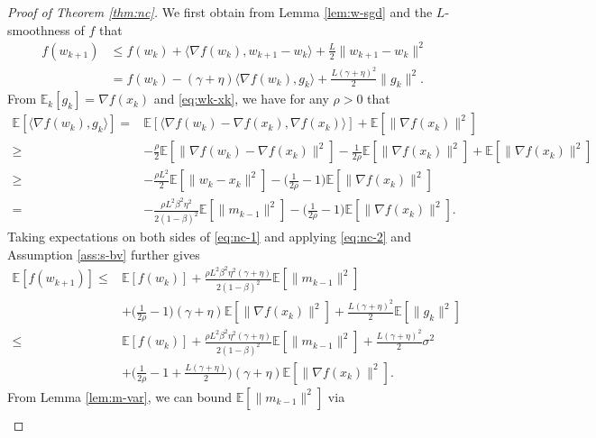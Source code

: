 \documentclass[10pt]{article}
\numberwithin{equation}{section}
\theoremstyle{definition}
\newcommand{\ebb}{\mathbb{E}}  %
\begin{document}
\begin{proof}[Proof of Theorem \ref{thm:nc}]
We first obtain from Lemma \ref{lem:w-sgd} and the $L$-smoothness of $f$ that
\begin{equation}\label{eq:nc-1}
\begin{aligned}
f(w_{k+1}) & \leq f(w_k)+\langle\nabla f(w_k), w_{k+1}-w_k\rangle+\frac{L}{2} \|w_{k+1}-w_k\|^2 \\
& =f(w_k)-(\gamma+\eta)\langle\nabla f(w_k), g_k\rangle+\frac{L (\gamma+\eta)^2}{2} \|g_k\|^2.
\end{aligned}
\end{equation}
From $\ebb_k[g_k]=\nabla f(x_k)$ and \eqref{eq:wk-xk}, we have for any $\rho>0$ that 
\begin{equation}\label{eq:nc-2}
\begin{aligned}
\ebb[\langle\nabla f(w_k), g_k\rangle]= & \ebb[\langle\nabla f(w_k)-\nabla f(x_k), \nabla f(x_k)\rangle]+\ebb[\|\nabla f(x_k)\|^2] \\
\ge & -\frac{\rho}{2} \ebb[\|\nabla f(w_k)-\nabla f(x_k)\|^2]- \frac{1}{2 \rho} \ebb[\|\nabla f(x_k)\|^2]+ \ebb[\|\nabla f(x_k)\|^2]\\
\ge & -\frac{\rho L^2}{2}\ebb[\|w_k-x_k\|^2]- \Big(\frac{1}{2 \rho}-1\Big) \ebb[\|\nabla f(x_k)\|^2]\\
= & -\frac{\rho L^2\beta^2\eta^2}{2(1-\beta)^2}\ebb[\|m_{k-1}\|^2]- \Big(\frac{1}{2 \rho}-1\Big) \ebb[\|\nabla f(x_k)\|^2].
\end{aligned}
\end{equation}
Taking expectations on both sides of \eqref{eq:nc-1} and applying \eqref{eq:nc-2} and Assumption \ref{ass:s-bv} further gives
\begin{equation}\label{eq:nc-3}
\begin{aligned}
\ebb[f(w_{k+1})] \leq & \ebb[f(w_k)]+\frac{\rho L^2\beta^2\eta^2(\gamma+\eta)}{2(1-\beta)^2}  \ebb[\|m_{k-1}\|^2] \\
& +\Big(\frac{1}{2 \rho}-1\Big)(\gamma+\eta) \ebb[\|\nabla f(x_k)\|^2]+\frac{L (\gamma+\eta)^2}{2} \ebb[\|g_k\|^2]\\
\leq & \ebb[f(w_k)]+\frac{\rho L^2\beta^2\eta^2(\gamma+\eta)}{2(1-\beta)^2} \ebb[\|m_{k-1}\|^2]+\frac{L(\gamma+\eta)^2}{2} \sigma^2 \\
& +\Big(\frac{1}{2 \rho}-1+\frac{L(\gamma+\eta)}{2}\Big)(\gamma+\eta) \ebb[\|\nabla f(x_k)\|^2].
\end{aligned}
\end{equation}
From Lemma \ref{lem:m-var}, we can bound $\ebb[\|m_{k-1}\|^2]$ via
\begin{align*}

\end{align*}
\end{proof}
\end{document}
